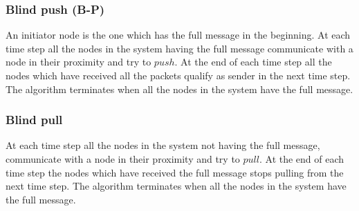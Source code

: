 \subsubsection{Blind push (B-P)}
{
An initiator node is the one which has the full message in the beginning. At each time step all the nodes 
in the system having the full message communicate with a node in their proximity and try to $push$. 
At the end of each time step all the nodes which have received all the packets qualify as sender in the next time step. The algorithm terminates 
when all the nodes in the system have the full message.}
\subsubsection{Blind pull}
At each time step 
all the nodes in the system not having the full message, communicate with a node in their proximity and try to $pull$. At the end of each time step 
the nodes which have received the full message stops pulling from the next time step. The algorithm terminates when all the nodes in the system have the full 
message.


